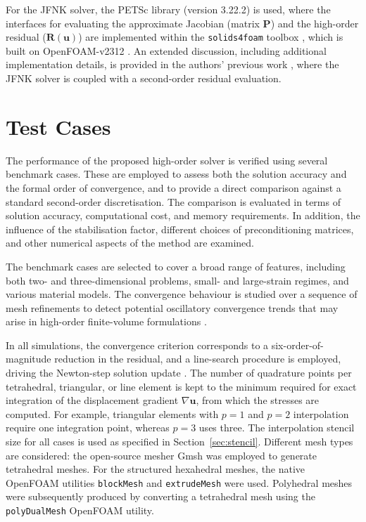 \documentclass[review,3p]{elsarticle}
\newcommand{\bb}{\boldsymbol}
\begin{document}
For the JFNK solver, the PETSc library (version 3.22.2) \cite{PETSc} is used, where the interfaces for evaluating the approximate Jacobian (matrix $\bb{P}$) and the high-order residual ($\boldsymbol{R}(\bb{u})$) are implemented within the \texttt{solids4foam} toolbox \cite{Cardiff2025a, Cardiff2018, Tukovic2018}, which is built on OpenFOAM-v2312 \cite{Weller1998}.
An extended discussion, including additional implementation details, is provided in the authors’ previous work \cite{Cardiff2026}, where the JFNK solver is coupled with a second-order residual evaluation.
%
%
\section{Test Cases}
\label{sec:test_cases}
%
%
The performance of the proposed high-order solver is verified using several benchmark cases.
These are employed to assess both the solution accuracy and the formal order of convergence, and to provide a direct comparison against a standard second-order discretisation.
The comparison is evaluated in terms of solution accuracy, computational cost, and memory requirements.
In addition, the influence of the stabilisation factor, different choices of preconditioning matrices, and other numerical aspects of the method are examined.

The benchmark cases are selected to cover a broad range of features, including both two- and three-dimensional problems, small- and large-strain regimes,
and various material models.
The convergence behaviour is studied over a sequence of mesh refinements to detect potential oscillatory convergence trends that may arise in high-order finite-volume formulations \cite{Nishikawa2025a}.

In all simulations, the convergence criterion corresponds to a six-order-of-magnitude reduction in the residual, and a line-search procedure is employed, driving the Newton-step solution update \cite{Cardiff2026}.
The number of quadrature points per tetrahedral, triangular, or line element is kept to the minimum required for exact integration of the displacement gradient $\nabla \bb{u}$, from which the stresses are computed.
For example, triangular elements with $p=1$ and $p=2$ interpolation require one integration point, whereas $p=3$ uses three.
The interpolation stencil size for all cases is used as specified in Section~\ref{sec:stencil}.
Different mesh types are considered: the open-source mesher Gmsh \cite{geuzaine2009gmsh} was employed to generate tetrahedral meshes. 
For the structured hexahedral meshes, the native OpenFOAM utilities \texttt{blockMesh} and \texttt{extrudeMesh} were used. 
Polyhedral meshes were subsequently produced by converting a tetrahedral mesh using the \texttt{polyDualMesh} OpenFOAM utility.
%
%
%
%
\end{document}
